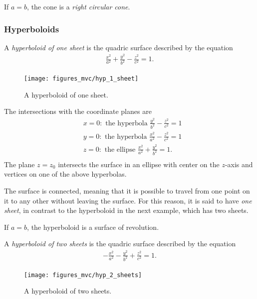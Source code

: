 \documentclass[12pt,letterpaper,reqno]{article}
\numberwithin{equation}{section}
\begin{document}
{If $a=b$, the cone is a \emph{right circular cone}.

\subsubsection{Hyperboloids}
\begin{defn}
	A \emph{hyperboloid of one sheet} is the quadric surface described by the equation
	\begin{align*}
		\frac{x^2}{a^2}+\frac{y^2}{b^2}-\frac{z^2}{c^2}=1.
	\end{align*}
\end{defn}

\begin{figure}[h]
	\begin{center}
		\texttt{[image: figures\_mvc/hyp\_1\_sheet]}
	\end{center}
	\caption{A hyperboloid of one sheet.}
\end{figure}

The intersections with the coordinate planes are
\begin{align*}
	&x=0: \text{ the hyperbola } \frac{y^2}{b^2}-\frac{z^2}{c^2}=1 \\
	&y=0: \text{ the hyperbola } \frac{x^2}{a^2}-\frac{z^2}{c^2}=1 \\
	&z=0: \text{ the ellipse } \frac{x^2}{a^2}+\frac{y^2}{b^2}=1. \\
\end{align*}
The plane $z=z_0$ intersects the surface in an ellipse with center on the $z$-axis and vertices on one of the above hyperbolas.

The surface is connected, meaning that it is possible to travel from one point on it to any other without leaving the surface. For this reason, it is said to have \emph{one sheet}, in contrast to the hyperboloid in the next example, which has two sheets.

If $a=b$, the hyperboloid is a surface of revolution. 

\begin{defn}
	A \emph{hyperboloid of two sheets} is the quadric surface described by the equation
	\begin{align*}
		-\frac{x^2}{a^2}-\frac{y^2}{b^2}+\frac{z^2}{c^2}=1.
	\end{align*}
\end{defn}

\begin{figure}[h]
	\begin{center}
		\texttt{[image: figures\_mvc/hyp\_2\_sheets]}
	\end{center}
	\caption{A hyperboloid of two sheets.}
\end{figure}

}
\end{document}
